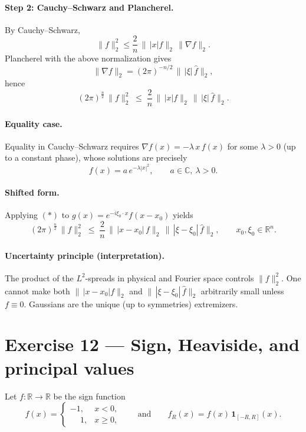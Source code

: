 \documentclass[12pt,a4paper]{article}
\theoremstyle{plain}
\theoremstyle{definition}
\theoremstyle{remark}
\theoremstyle{remark}
\begin{document}
\smallskip

\paragraph{Step 2: Cauchy--Schwarz and Plancherel.}
By Cauchy--Schwarz,
\[
\|f\|_2^2 \le \frac2n\,\|\,|x|f\|_2\,\|\nabla f\|_2.
\]
Plancherel with the above normalization gives
\[
\|\nabla f\|_2=(2\pi)^{-n/2}\,\|\,|\xi|\,\widehat f\|_2,
\]
hence
\[
(2\pi)^{\frac n2}\,\|f\|_2^2
\;\le\; \frac2n\,\|\,|x|f\|_2\,\|\,|\xi|\,\widehat f\|_2.
\tag{$\ast$}
\]

\smallskip

\paragraph{Equality case.}
Equality in Cauchy--Schwarz requires $\nabla f(x)=-\lambda\,x\,f(x)$ for some $\lambda>0$
(up to a constant phase), whose solutions are precisely
\[
f(x)=a\,e^{-\lambda|x|^2},\qquad a\in\mathbb C,\ \lambda>0.
\]

\smallskip

\paragraph{Shifted form.}
Applying $(\ast)$ to $g(x)=e^{-i\xi_0\cdot x}f(x-x_0)$ yields
\[
(2\pi)^{\frac n2}\,\|f\|_2^2
\;\le\; \frac2n\,\|\,|x-x_0|\,f\|_2\,\|\,|\xi-\xi_0|\,\widehat f\|_2,
\qquad x_0,\xi_0\in\mathbb R^n.
\]

\smallskip

\paragraph{Uncertainty principle (interpretation).}
The product of the $L^2$-spreads in physical and Fourier space controls $\|f\|_2^2$.
One cannot make both $\|\,|x-x_0|f\|_2$ and $\|\,|\xi-\xi_0|\,\widehat f\|_2$ arbitrarily small unless $f\equiv0$.
Gaussians are the unique (up to symmetries) extremizers.



\section*{Exercise 12 — Sign, Heaviside, and principal values}


Let $f:\mathbb R\to\mathbb R$ be the sign function
\[
f(x)=
\begin{cases}
	-1,& x<0,\\
	\phantom{-}1,& x\ge 0,
\end{cases}
\qquad\text{and}\qquad
f_R(x)=f(x)\,\mathbf 1_{[-R,R]}(x).
\]
\end{document}
